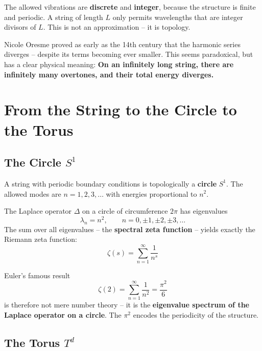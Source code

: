 	\begin{keypoint}
		The allowed vibrations are \textbf{discrete} and \textbf{integer}, because the structure is finite and periodic. A string of length $L$ only permits wavelengths that are integer divisors of $L$. This is not an approximation -- it is topology.
	\end{keypoint}
	
	Nicole Oresme proved as early as the 14th century that the harmonic series diverges -- despite its terms becoming ever smaller. This seems paradoxical, but has a clear physical meaning: \textbf{On an infinitely long string, there are infinitely many overtones, and their total energy diverges.}


	\section{From the String to the Circle to the Torus}
	
	\subsection{The Circle $S^1$}
	
	A string with periodic boundary conditions is topologically a \textbf{circle} $S^1$. The allowed modes are $n = 1, 2, 3, \ldots$ with energies proportional to $n^2$.
	
	The Laplace operator $\Delta$ on a circle of circumference $2\pi$ has eigenvalues
	\begin{equation}
		\lambda_n = n^2, \qquad n = 0, \pm 1, \pm 2, \pm 3, \ldots
	\end{equation}
	The sum over all eigenvalues -- the \textbf{spectral zeta function} -- yields exactly the Riemann zeta function:
	\begin{equation}
		\zeta(s) = \sum_{n=1}^{\infty} \frac{1}{n^s}
	\end{equation}
	
	Euler's famous result
	\begin{equation}
		\zeta(2) = \sum_{n=1}^{\infty} \frac{1}{n^2} = \frac{\pi^2}{6}
		\label{eq:basel}
	\end{equation}
	is therefore not mere number theory -- it is the \textbf{eigenvalue spectrum of the Laplace operator on a circle}. The $\pi^2$ encodes the periodicity of the structure.
	
	\subsection{The Torus $T^d$}
	
